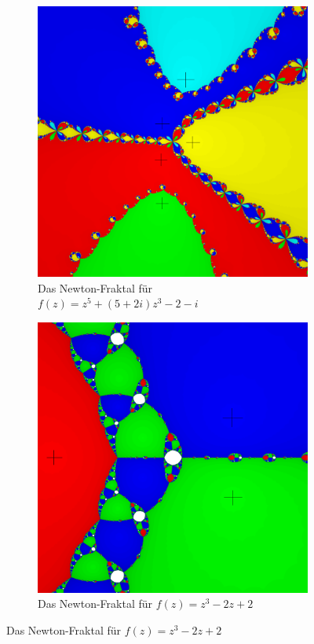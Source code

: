 \documentclass[a4paper,12pt]{llncs}
\makeatletter
\newcommand\nocaption{%
	\renewcommand\p@subfigure{}
	\renewcommand\thesubfigure{\thefigure\alph{subfigure}}
}
\numberwithin{equation}{section}
\makeatother
\begin{document}
\begin{figure}[ht]   
	\nocaption
	\begin{subfigure}{.5\textwidth}
		\centering
		\includegraphics[width=.8\linewidth]{figures/output_f7}
		\captionsetup{width=0.8\textwidth}
		\caption{Das Newton-Fraktal für $f(z)=z^5 + (5+2i)z^3 - 2-i $ }
		\label{fig:output_f7}
	\end{subfigure}%
	\begin{subfigure}{.5\textwidth}
		\centering
		\includegraphics[width=.8\linewidth]{figures/output_f5}
		\captionsetup{width=0.8\textwidth}
		\caption{Das Newton-Fraktal für $f(z)=z^3 - 2z + 2$ }
		\label{fig:output_f5}
	\end{subfigure}%
\end{figure}
\end{document}
